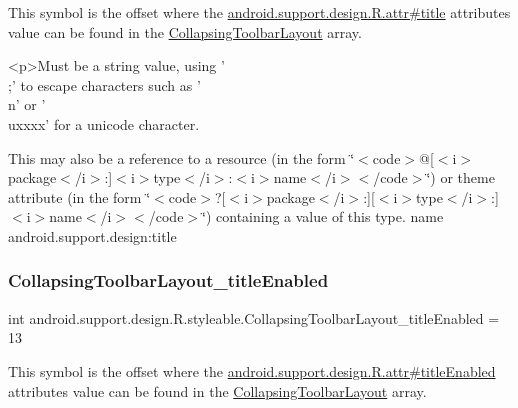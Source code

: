 This symbol is the offset where the \hyperlink{classandroid_1_1support_1_1design_1_1R_1_1attr_a1269cd6a0a69f93e03e342a0bca4f7a2}{android.\+support.\+design.\+R.\+attr\#title} attribute\textquotesingle{}s value can be found in the \hyperlink{classandroid_1_1support_1_1design_1_1R_1_1styleable_a4a019838b1c3daad84b4ffff397db335}{Collapsing\+Toolbar\+Layout} array.

\begin{DoxyVerb}      <p>Must be a string value, using '\\;' to escape characters such as '\\n' or '\\uxxxx' for a unicode character.
\end{DoxyVerb}
 

This may also be a reference to a resource (in the form \char`\"{}$<$code$>$@\mbox{[}$<$i$>$package$<$/i$>$\+:\mbox{]}$<$i$>$type$<$/i$>$\+:$<$i$>$name$<$/i$>$$<$/code$>$\char`\"{}) or theme attribute (in the form \char`\"{}$<$code$>$?\mbox{[}$<$i$>$package$<$/i$>$\+:\mbox{]}\mbox{[}$<$i$>$type$<$/i$>$\+:\mbox{]}$<$i$>$name$<$/i$>$$<$/code$>$\char`\"{}) containing a value of this type.  name android.\+support.\+design\+:title \mbox{\label{classandroid_1_1support_1_1design_1_1R_1_1styleable_aee5150e8b214ad7200a094c9faf6bbee}} 
\subsubsection{\texorpdfstring{Collapsing\+Toolbar\+Layout\+\_\+title\+Enabled}{CollapsingToolbarLayout\_titleEnabled}}
{\footnotesize\ttfamily int android.\+support.\+design.\+R.\+styleable.\+Collapsing\+Toolbar\+Layout\+\_\+title\+Enabled = 13\hspace{0.3cm}{\ttfamily [static]}}

This symbol is the offset where the \hyperlink{classandroid_1_1support_1_1design_1_1R_1_1attr_a67eaab883b378bf1d3a7ec621e393f22}{android.\+support.\+design.\+R.\+attr\#title\+Enabled} attribute\textquotesingle{}s value can be found in the \hyperlink{classandroid_1_1support_1_1design_1_1R_1_1styleable_a4a019838b1c3daad84b4ffff397db335}{Collapsing\+Toolbar\+Layout} array.

